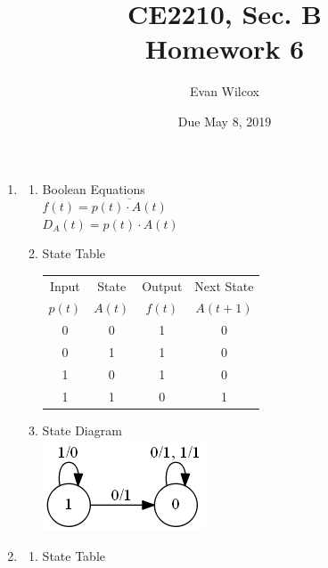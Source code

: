 \documentclass[a4paper]{article}
\title{CE2210, Sec. B \\Homework 6}
\author{Evan Wilcox}
\date{Due May 8, 2019}
\begin{document}
    \maketitle

    \begin{enumerate}
      \item  
      \begin{enumerate}

        \item Boolean Equations \\
        
        $f(t) = \overline{p(t) \cdot A(t)}$ \\
        $D_{A}(t) = p(t) \cdot A(t)$ \\



        \item State Table \\
        
        \begin{tabular}{ c c | c | c } 
        Input & State & Output & Next State \\ 
        $p(t)$ & $A(t)$ & $f(t)$ & $A(t+1)$ \\ \hline
        0 & 0 & 1 & 0 \\
        0 & 1 & 1 & 0 \\
        1 & 0 & 1 & 0 \\
        1 & 1 & 0 & 1 \\
        \end{tabular}


        \vspace{0.5cm}
        \item State Diagram \\
        \includegraphics[scale=0.5]{1c}


      \end{enumerate}

      \vspace{0.75cm}
      \item  
      \begin{enumerate}

        \item State Table \\
        

\end{enumerate}
\end{enumerate}
\end{document}
